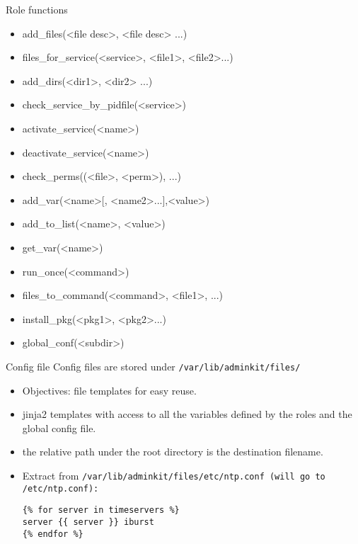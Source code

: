 \documentclass[xcolor=dvipsnames]{beamer}
\begin{document}
\begin{frame}{Role functions}

\begin{itemize}
  \item add\_files(<file desc>, <file desc> ...)

  \item files\_for\_service(<service>, <file1>, <file2>...)

  \item add\_dirs(<dir1>, <dir2> ...)

  \item check\_service\_by\_pidfile(<service>)

  \item activate\_service(<name>)
  
  \item deactivate\_service(<name>)
  
  \item check\_perms((<file>, <perm>), ...)

  \item add\_var(<name>[, <name2>...],<value>)

  \item add\_to\_list(<name>, <value>)

  \item get\_var(<name>)

  \item run\_once(<command>)

  \item files\_to\_command(<command>, <file1>, ...)

  \item install\_pkg(<pkg1>, <pkg2>...)

  \item global\_conf(<subdir>)
\end{itemize}

\end{frame}

\begin{frame}[fragile]{Config file}
  Config files are stored under \tt{/var/lib/adminkit/files/}
\begin{itemize}
  \item Objectives: file templates for easy reuse.
  \item jinja2 templates with access to all the variables defined by
    the roles and the global config file.
  \item the relative path under the root directory is the destination
    filename.
  \item Extract from \tt{/var/lib/adminkit/files/etc/ntp.conf} (will
    go to \tt{/etc/ntp.conf}):
\begin{lstlisting}
{% for server in timeservers %}
server {{ server }} iburst
{% endfor %}
\end{lstlisting}
\end{itemize}
\end{frame}
\end{document}

